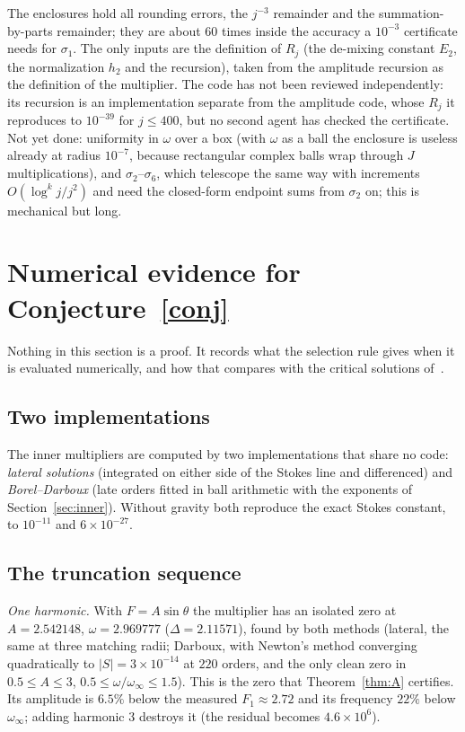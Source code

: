 \documentclass{amsart}
\numberwithin{equation}{section}
\theoremstyle{plain}
\theoremstyle{definition}
\theoremstyle{remark}
\newcommand{\winf}{\omega_\infty}
\begin{document}
The enclosures hold all rounding errors, the $j^{-3}$ remainder and the summation-by-parts remainder; they are about $60$ times
inside the accuracy a $10^{-3}$ certificate needs for $\sigma_1$. The only inputs are the definition of $R_j$ (the de-mixing constant
$E_2$, the normalization $h_2$ and the recursion), taken from the amplitude recursion as the definition of the multiplier.
The code has not been reviewed independently: its recursion is an implementation separate from the amplitude code, whose
$R_j$ it reproduces to $10^{-39}$ for $j \le 400$, but no second agent has checked the certificate. Not yet done: uniformity in $\omega$ over a box (with $\omega$ as a ball the enclosure is useless already at radius $10^{-7}$, because
rectangular complex balls wrap through $J$ multiplications), and $\sigma_2$--$\sigma_6$, which telescope the same way with increments
$O(\log^kj/j^2)$ and need the closed-form endpoint sums from $\sigma_2$ on; this is mechanical but long.

\section{Numerical evidence for Conjecture~\ref{conj}}
\label{sec:evidence}

Nothing in this section is a proof. It records what the selection rule gives when it is evaluated numerically, and how
that compares with the critical solutions of~\cite{companion}.

\subsection{Two implementations}
The inner multipliers are computed by two implementations that share no code: \emph{lateral solutions} (integrated on either
side of the Stokes line and differenced) and \emph{Borel--Darboux} (late orders fitted in ball arithmetic with the exponents of
Section~\ref{sec:inner}). Without gravity both reproduce the exact Stokes constant, to $10^{-11}$ and $6\times10^{-27}$.

\subsection{The truncation sequence}
\label{sec:trunc}
\emph{One harmonic.} With $F = A\sin\theta$ the multiplier has an isolated zero at $A = 2.542148$, $\omega = 2.969777$ ($\Delta = 2.11571$),
found by both methods (lateral, the same at three matching radii; Darboux, with Newton's method converging quadratically to
$|S| = 3\times10^{-14}$ at $220$ orders, and the only clean zero in $0.5 \le A \le 3$, $0.5 \le \omega/\winf \le 1.5$). This is the zero that
Theorem~\ref{thm:A} certifies. Its amplitude is $6.5\%$ below the measured $F_1 \approx 2.72$ and its frequency $22\%$ below $\winf$; adding
harmonic $3$ destroys it (the residual becomes $4.6\times10^6$).
\end{document}
